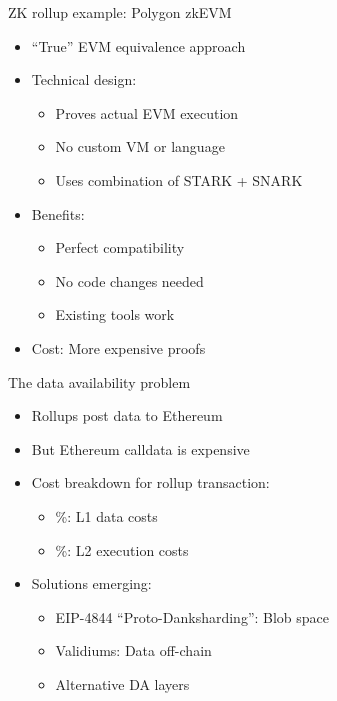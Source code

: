 \documentclass[aspectratio=169, lualatex, handout]{beamer}
\begin{document}
\begin{frame}{ZK rollup example: Polygon zkEVM}
	\begin{itemize}
		\item ``True'' EVM equivalence approach
		\item Technical design:
		      \begin{itemize}
			      \item Proves actual EVM execution
			      \item No custom VM or language
			      \item Uses combination of STARK + SNARK
		      \end{itemize}
		\item Benefits:
		      \begin{itemize}
			      \item Perfect compatibility
			      \item No code changes needed
			      \item Existing tools work
		      \end{itemize}
		\item Cost: More expensive proofs
	\end{itemize}
\end{frame}

\begin{frame}{The data availability problem}
	\begin{itemize}
		\item Rollups post data to Ethereum
		\item But Ethereum calldata is expensive
		\item Cost breakdown for rollup transaction:
		      \begin{itemize}
			      \item {}\%: L1 data costs
			      \item {}\%: L2 execution costs
		      \end{itemize}
		\item Solutions emerging:
		      \begin{itemize}
			      \item EIP-4844 ``Proto-Danksharding'': Blob space
			      \item Validiums: Data off-chain
			      \item Alternative DA layers
		      \end{itemize}
	\end{itemize}
\end{frame}
\end{document}
